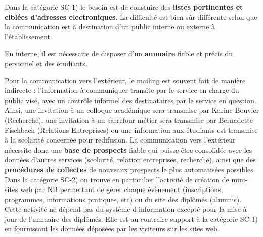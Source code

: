 \documentclass{book}
\begin{document}
Dans la catégorie SC-1) le besoin est de constuire des \textbf{listes 
pertinentes et ciblées d'adresses electroniques}. La difficulté
est bien sûr différente selon que la communication est à destination
d'un public interne ou externe à l'établissement.

En interne, il est nécessaire de disposer d'un \textbf{annuaire}
fiable et précis du personnel et des étudiants. 

Pour la communication vers l'extérieur, le mailing est souvent 
fait de manière indirecte : l'information à communiquer transite par
le service en charge du public visé, avec un contrôle informel des 
destinataires par le service en question. Ainsi, une invitation à un 
colloque académique sera transmise par Karine Bouvier (Recherche),
une invitation à un carrefour métier sera transmise par Bernadette 
Fischbach (Relations Entreprises) ou une information aux étudiants
est transmise à la scolarité concernée pour redifusion. La communication 
vers l'extérieur nécessite donc une \textbf{base de prospects} fiable 
qui puisse être consolidée avec les données d'autres services (scolarité, 
relation entreprises, recherche), ainsi que des \textbf{procédures 
de collectes} de nouveaux prospects le plus automatisées possibles.\\

Dans la catégorie SC-2) on trouve en particulier l'activité de création
de mini-sites web par NB permettant de gérer chaque évènement (inscriptions,
programmes, informations pratiques, etc) ou du site des diplômés (alumnis).
Cette activité ne dépend pas du système d'information excepté pour
la mise à jour de l'annuaire des diplômés. Elle est au contraire 
support à la catégorie SC-1) en fournissant les données déposées par les
visiteurs sur les sites web.\\ 
\end{document}

